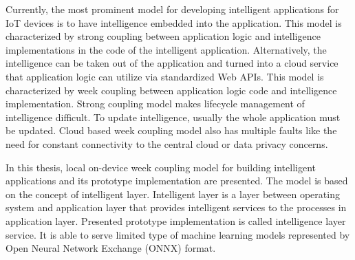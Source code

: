 \documentclass[english, 12pt, a4paper, elec, utf8, online]{aaltothesis}
\date{24.4.2018}
\begin{document}
\makecoverpage

\makecopyrightpage


\begin{abstractpage}[english]
Currently, the most prominent model for developing intelligent applications for IoT devices is to have intelligence embedded into the application. This model is characterized by strong coupling between application logic and intelligence implementations in the code of the intelligent application. Alternatively, the intelligence can be taken out of the application and turned into a cloud service that application logic can utilize via standardized Web APIs. This model is characterized by week coupling between application logic code and intelligence implementation. Strong coupling model makes lifecycle management of intelligence difficult. To update intelligence, usually the whole application must be updated.  Cloud based week coupling model also has multiple faults like the need for constant connectivity to the central cloud or data privacy concerns. 

In this thesis, local on-device week coupling model for building intelligent applications and its prototype implementation are presented.  The model is based on the concept of intelligent layer. Intelligent layer is a layer between operating system and application layer that provides intelligent services to the processes in application layer. Presented prototype implementation is called intelligence layer service. It is able to serve limited type of machine learning models represented by Open Neural Network Exchange (ONNX) format.                
\end{abstractpage}
%  
%  
\end{document}
